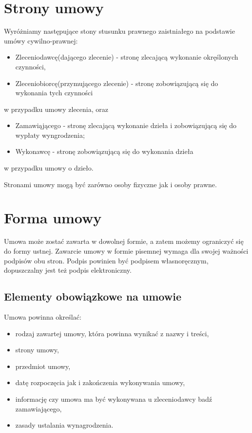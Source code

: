 \section[Strony umowy][Strony umowy]{Strony umowy}
Wyróżniamy następujące stony stusunku prawnego zaistniałego na podstawie umówy cywilno-prawnej:
\begin{itemize}
	\item Zleceniodawcę(dającego zlecenie) - stronę zlecającą wykonanie okręślonych czynności,
	\item Zleceniobiorcę(przymującego zlecenie) - stronę zobowiązującą się do wykonania tych czynności
\end{itemize}
w przypadku umowy zlecenia, oraz
\begin{itemize}
	\item Zamawiąjącego - stronę zlecającą wykonanie dzieła i zobowiązującą się do wypłaty wyngrodzenia;
	\item Wykonawcę - stronę zobowiązującą się do wykonania dzieła
\end{itemize}
w przypadku umowy o dzieło.

Stronami umowy mogą być zarówno osoby fizyczne jak i osoby prawne.

\section[Forma umowy][Forma umowy]{Forma umowy}
Umowa może zostać zawarta w dowolnej formie, a zatem możemy ograniczyć się do formy ustnej. Zawarcie umowy w formie pisemnej wymaga dla swojej ważności podpisów obu stron. Podpis powinien być podpisem własnoręcznym, dopuszczalny jest też podpis elektroniczny.

\subsection[Elementy obowiązkowe na umowie][Elementy obowiązkowe na umowie]{Elementy obowiązkowe na umowie}
Umowa powinna określać:
\begin{itemize}
\item rodzaj zawartej umowy, która powinna wynikać z nazwy i treści,
\item strony umowy,
\item przedmiot umowy,
\item datę rozpoczęcia jak i zakończenia wykonywania umowy,
\item informację czy umowa ma być wykonywana u zleceniodawcy badź zamawiającego,
\item zasady ustalania wynagrodzenia.
\end{itemize}

